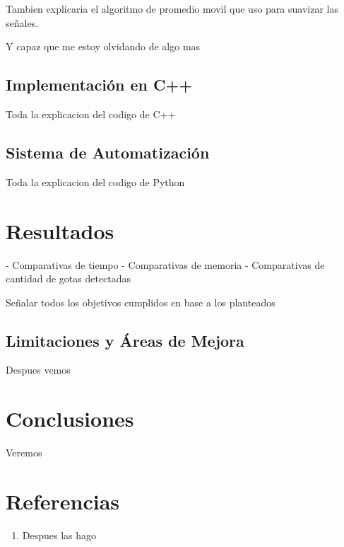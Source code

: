 \documentclass[12pt,a4paper]{article}
\begin{document}
Tambien explicaria el algoritmo de promedio movil que uso para suavizar las señales.

Y capaz que me estoy olvidando de algo mas

\subsection{Implementación en C++}

Toda la explicacion del codigo de C++

\subsection{Sistema de Automatización}

Toda la explicacion del codigo de Python

\section{Resultados}

- Comparativas de tiempo
- Comparativas de memoria
- Comparativas de cantidad de gotas detectadas

Señalar todos los objetivos cumplidos en base a los planteados

\subsection{Limitaciones y Áreas de Mejora}

Despues vemos

\section{Conclusiones}

Veremos 

\section{Referencias}

\begin{enumerate}
    \item Despues las hago
\end{enumerate}
\end{document}
